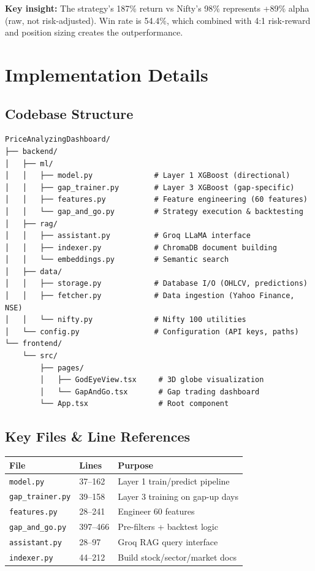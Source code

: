 \documentclass[11pt,a4paper]{article}
\begin{document}
\textbf{Key insight:} The strategy's 187\% return vs Nifty's 98\% represents +89\% alpha (raw, not risk-adjusted). Win rate is 54.4\%, which combined with 4:1 risk-reward and position sizing creates the outperformance.

\section{Implementation Details}

\subsection{Codebase Structure}

\begin{lstlisting}[language=text, caption=Project Directory Layout]
PriceAnalyzingDashboard/
├── backend/
│   ├── ml/
│   │   ├── model.py              # Layer 1 XGBoost (directional)
│   │   ├── gap_trainer.py        # Layer 3 XGBoost (gap-specific)
│   │   ├── features.py           # Feature engineering (60 features)
│   │   └── gap_and_go.py         # Strategy execution & backtesting
│   ├── rag/
│   │   ├── assistant.py          # Groq LLaMA interface
│   │   ├── indexer.py            # ChromaDB document building
│   │   └── embeddings.py         # Semantic search
│   ├── data/
│   │   ├── storage.py            # Database I/O (OHLCV, predictions)
│   │   ├── fetcher.py            # Data ingestion (Yahoo Finance, NSE)
│   │   └── nifty.py              # Nifty 100 utilities
│   └── config.py                 # Configuration (API keys, paths)
└── frontend/
    └── src/
        ├── pages/
        │   ├── GodEyeView.tsx     # 3D globe visualization
        │   └── GapAndGo.tsx       # Gap trading dashboard
        └── App.tsx                # Root component
\end{lstlisting}

\subsection{Key Files & Line References}

\begin{table}[h]
\centering
\small
\begin{tabular}{llp{4cm}}
\toprule
\textbf{File} & \textbf{Lines} & \textbf{Purpose} \\
\midrule
\texttt{model.py} & 37–162 & Layer 1 train/predict pipeline \\
\texttt{gap\_trainer.py} & 39–158 & Layer 3 training on gap-up days \\
\texttt{features.py} & 28–241 & Engineer 60 features \\
\texttt{gap\_and\_go.py} & 397–466 & Pre-filters + backtest logic \\
\texttt{assistant.py} & 28–97 & Groq RAG query interface \\
\texttt{indexer.py} & 44–212 & Build stock/sector/market docs \\
\bottomrule
\end{tabular}
\end{table}
\end{document}

